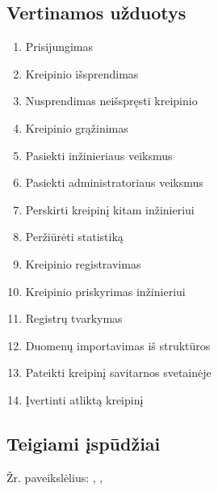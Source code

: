 \newpage	

\subsection{Vertinamos užduotys}
	\begin{enumerate}
	\item Prisijungimas
	\item Kreipinio išsprendimas
	\item Nusprendimas neišspręsti kreipinio
	\item Kreipinio grąžinimas
	\item Pasiekti inžinieriaus veiksmus
	\item Pasiekti administratoriaus veiksmus
	\item Perskirti kreipinį kitam inžinieriui
	\item Peržiūrėti statistiką
	\item Kreipinio registravimas
	\item Kreipinio priskyrimas inžinieriui
	\item Registrų tvarkymas
	\item Duomenų importavimas iš struktūros
	\item Pateikti kreipinį savitarnos svetainėje
	\item Įvertinti atliktą kreipinį
	\end{enumerate}
	
\newpage	
	
\subsection{Teigiami įspūdžiai}

	Žr. paveikslėlius:
	 ,
	 ,

	
	

